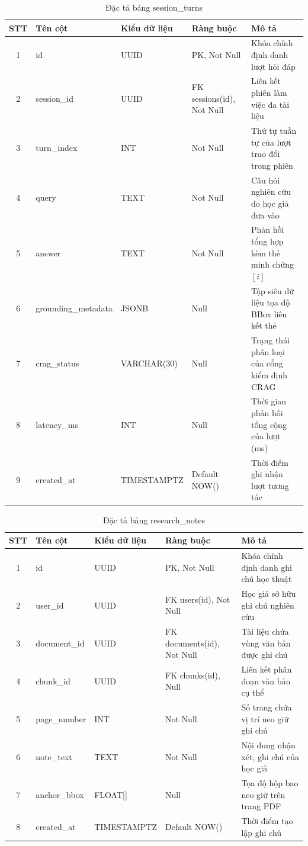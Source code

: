 \begin{table}[H]
\centering
\singlespacing
\fontsize{9pt}{11.5pt}\selectfont
\caption{Đặc tả bảng session\_turns}
\label{tab:app_session_turns}
\renewcommand{\arraystretch}{0.65}
\begin{tabularx}{\textwidth}{|c|>{\raggedright\arraybackslash}p{3.2cm}|>{\raggedright\arraybackslash}p{2.6cm}|>{\raggedright\arraybackslash}p{3.0cm}|>{\raggedright\arraybackslash}X|}
\hline
\textbf{STT} & \centering\textbf{Tên cột} & \centering\textbf{Kiểu dữ liệu} & \centering\textbf{Ràng buộc} & \centering\textbf{Mô tả} \tabularnewline \hline
1 & id & UUID & PK, Not Null & Khóa chính định danh lượt hỏi đáp \tabularnewline \hline
2 & session\_id & UUID & FK sessions(id), Not Null & Liên kết phiên làm việc đa tài liệu \tabularnewline \hline
3 & turn\_index & INT & Not Null & Thứ tự tuần tự của lượt trao đổi trong phiên \tabularnewline \hline
4 & query & TEXT & Not Null & Câu hỏi nghiên cứu do học giả đưa vào \tabularnewline \hline
5 & answer & TEXT & Not Null & Phản hồi tổng hợp kèm thẻ minh chứng $[i]$ \tabularnewline \hline
6 & grounding\_metadata & JSONB & Null & Tập siêu dữ liệu tọa độ BBox liên kết thẻ \tabularnewline \hline
7 & crag\_status & VARCHAR(30) & Null & Trạng thái phân loại của cổng kiểm định CRAG \tabularnewline \hline
8 & latency\_ms & INT & Null & Thời gian phản hồi tổng cộng của lượt (ms) \tabularnewline \hline
9 & created\_at & TIMESTAMPTZ & Default NOW() & Thời điểm ghi nhận lượt tương tác \tabularnewline \hline
\end{tabularx}
\end{table}

\begin{table}[H]
\centering
\singlespacing
\fontsize{9pt}{11.5pt}\selectfont
\caption{Đặc tả bảng research\_notes}
\label{tab:app_notes}
\renewcommand{\arraystretch}{0.65}
\begin{tabularx}{\textwidth}{|c|>{\raggedright\arraybackslash}p{3.2cm}|>{\raggedright\arraybackslash}p{2.6cm}|>{\raggedright\arraybackslash}p{3.0cm}|>{\raggedright\arraybackslash}X|}
\hline
\textbf{STT} & \centering\textbf{Tên cột} & \centering\textbf{Kiểu dữ liệu} & \centering\textbf{Ràng buộc} & \centering\textbf{Mô tả} \tabularnewline \hline
1 & id & UUID & PK, Not Null & Khóa chính định danh ghi chú học thuật \tabularnewline \hline
2 & user\_id & UUID & FK users(id), Not Null & Học giả sở hữu ghi chú nghiên cứu \tabularnewline \hline
3 & document\_id & UUID & FK documents(id), Not Null & Tài liệu chứa vùng văn bản được ghi chú \tabularnewline \hline
4 & chunk\_id & UUID & FK chunks(id), Null & Liên kết phân đoạn văn bản cụ thể \tabularnewline \hline
5 & page\_number & INT & Not Null & Số trang chứa vị trí neo giữ ghi chú \tabularnewline \hline
6 & note\_text & TEXT & Not Null & Nội dung nhận xét, ghi chú của học giả \tabularnewline \hline
7 & anchor\_bbox & FLOAT[] & Null & Tọa độ hộp bao neo giữ trên trang PDF \tabularnewline \hline
8 & created\_at & TIMESTAMPTZ & Default NOW() & Thời điểm tạo lập ghi chú \tabularnewline \hline
\end{tabularx}
\end{table}

